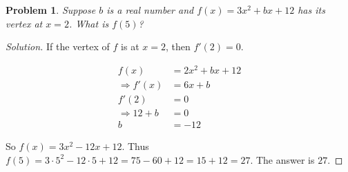 \documentclass[oneside]{book}
\theoremstyle{mystyle}
\newtheorem{problem}{Problem}[section]
\begin{document}
\begin{problem}
Suppose $b$ is a real number and $f(x) = 3x^2+bx+12$ has its vertex at $x=2$. What is $f(5)$?
\end{problem}
\begin{proof}[Solution]
If the vertex of $f$ is at $x=2$, then $f'(2) = 0$.

\begin{align}
    \nonumber f(x) &= 2x^2 + bx + 12 \\
    \nonumber \Rightarrow f'(x) &= 6x+b \\
    \nonumber f'(2) &= 0 \\
    \nonumber \Rightarrow 12 + b &= 0 \\
    \nonumber b &= -12
\end{align}

So $f(x) = 3x^2 -12 x + 12$. Thus $f(5) = 3\cdot 5^2 - 12\cdot 5 + 12 = 75 - 60 + 12 = 15 + 12 = 27$. The answer is $27$.
\end{proof}
\end{document}
